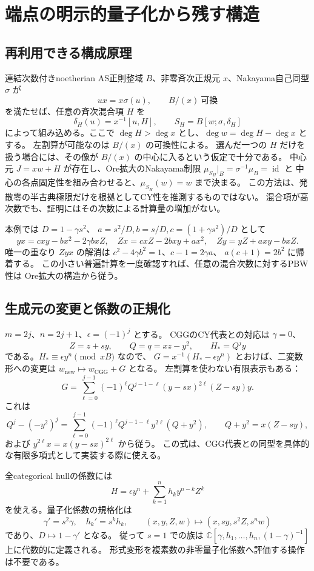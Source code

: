\section{端点の明示的量子化から残す構造}
\label{sec:notes-endpoint-quantization-v37}

\subsection{再利用できる構成原理}

連結次数付きnoetherian AS正則整域 $B$、非零斉次正規元 $x$、Nakayama自己同型 $\sigma$ が
\[
 ux=x\sigma(u),\qquad B/(x)\ \text{可換}
\]
を満たせば、任意の斉次混合項 $H$ を
\[
 \delta_H(u)=x^{-1}[u,H],\qquad
 S_H=B[w;\sigma,\delta_H]
\]
によって組み込める。ここで $\deg H>\deg x$ とし、$\deg w=\deg H-\deg x$ とする。
左割算が可能なのは $B/(x)$ の可換性による。
選んだ一つの $H$ だけを扱う場合には、その像が $B/(x)$ の中心に入るという仮定で十分である。
中心元 $J=xw+H$ が存在し、Ore拡大のNakayama制限
$\mu_{S_H}|_B=\sigma^{-1}\mu_B=\operatorname{id}$ と
中心の各点固定性を組み合わせると、$\mu_{S_H}(w)=w$ まで決まる。
この方法は、発散零の半古典極限だけを根拠としてCY性を推測するものではない。
混合項が高次数でも、証明にはその次数による計算量の増加がない。

本例では $D=1-\gamma s^2$、
$a=s^2/D,b=s/D,c=(1+\gamma s^2)/D$ として
\[
 yx=cxy-bx^2-2\gamma bxZ,\quad
 Zx=cxZ-2bxy+ax^2,\quad
 Zy=yZ+axy-bxZ.
\]
唯一の重なり $Zyx$ の解消は
$c^2-4\gamma b^2=1$、$c-1=2\gamma a$、
$a(c+1)=2b^2$ に帰着する。
この小さい普遍計算を一度確認すれば、任意の混合次数に対するPBW性は
Ore拡大の構造から従う。

\subsection{生成元の変更と係数の正規化}

$m=2j$、$n=2j+1$、$\epsilon=(-1)^j$ とする。
CGGのCY代表との対応は $\gamma=0$、
\[
 Z=z+sy,\qquad Q=q=xz-y^2,\qquad H_*=Q^j y
\]
である。$H_* \equiv\epsilon y^n\pmod{xB}$ なので、
$G=x^{-1}(H_*-\epsilon y^n)$ とおけば、二変数形への変更は
$w_{\mathrm{new}}\mapsto w_{\mathrm{CGG}}+G$ となる。
左割算を使わない有限表示もある：
\[
 G=\sum_{\ell=0}^{j-1}(-1)^\ell
 Q^{j-1-\ell}(y-sx)^{2\ell}(Z-sy)y.
\]
これは
\[
 Q^j-(-y^2)^j
 =\sum_{\ell=0}^{j-1}(-1)^\ell Q^{j-1-\ell}y^{2\ell}(Q+y^2),
 \qquad Q+y^2=x(Z-sy),
\]
および $y^{2\ell}x=x(y-sx)^{2\ell}$ から従う。
この式は、CGG代表との同型を具体的な有限多項式として実装する際に使える。

全categorical hullの係数には
\[
 H=\epsilon y^n+\sum_{k=1}^{n}h_k y^{n-k}Z^k
\]
を使える。量子化係数の規格化は
\[
 \gamma'=s^2\gamma,\quad h_k'=s^kh_k,\qquad
 (x,y,Z,w)\mapsto(x,sy,s^2Z,s^n w)
\]
であり、$D\mapsto1-\gamma'$ となる。
従って $s=1$ での族は
$\mathbb C[\gamma,h_1,\ldots,h_n,(1-\gamma)^{-1}]$ 上に代数的に定義される。
形式変形を複素数の非零量子化係数へ評価する操作は不要である。

